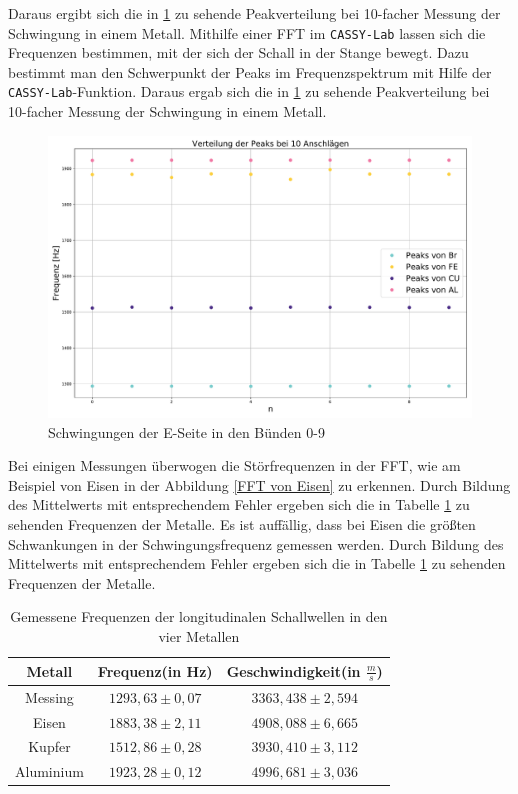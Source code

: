\documentclass[a4paper, 11pt]{article}
\begin{document}
\noindent Daraus ergibt sich die in \ref{fig:Peaks} zu sehende Peakverteilung bei 10-facher Messung der Schwingung in einem Metall.
Mithilfe einer FFT im \texttt{CASSY-Lab} lassen sich die Frequenzen bestimmen, mit der sich der Schall in der Stange bewegt. Dazu bestimmt man den Schwerpunkt der Peaks im Frequenzspektrum mit Hilfe der \texttt{CASSY-Lab}-Funktion. Daraus ergab sich die in \ref{fig:Peaks} zu sehende Peakverteilung bei 10-facher Messung der Schwingung in einem Metall.

\begin{figure}[H]
	\centering
	\includegraphics[scale=0.3]{../Plots/Peakverteilung.pdf}
	\caption{Schwingungen der E-Seite in den Bünden 0-9}
	\label{fig:Peaks}
\end{figure}

\noindent Bei einigen Messungen überwogen die Störfrequenzen in der FFT, wie am Beispiel von Eisen in der Abbildung \ref{FFT von Eisen} zu erkennen. Durch Bildung des Mittelwerts mit entsprechendem Fehler ergeben sich die in Tabelle \ref{table:Peaks} zu sehenden Frequenzen der Metalle. Es ist auffällig, dass bei Eisen die größten Schwankungen in der Schwingungsfrequenz gemessen werden.
Durch Bildung des Mittelwerts mit entsprechendem Fehler ergeben sich die in Tabelle \ref{table:Peaks} zu sehenden Frequenzen der Metalle.

\begin{table}[H]
\centering
\renewcommand{\arraystretch}{1.2}
\begin{tabular}{|c|c|c|}
\hline Metall & Frequenz(in Hz) & Geschwindigkeit(in $\frac{m}{s}$) \\
\hline Messing & $1293,63 \pm 0,07$ & $3363,438 \pm 2,594$ \\
Eisen & $1883,38 \pm 2,11$ & $4908,088 \pm 6,665$ \\
Kupfer & $1512,86 \pm 0,28$ & $3930,410 \pm 3,112$ \\
Aluminium & $1923,28 \pm 0,12$ & $4996,681 \pm 3,036$ \\
\hline
\end{tabular}
\caption{Gemessene Frequenzen der longitudinalen Schallwellen in den vier Metallen}
\label{table:Peaks}
\end{table}
\end{document}

